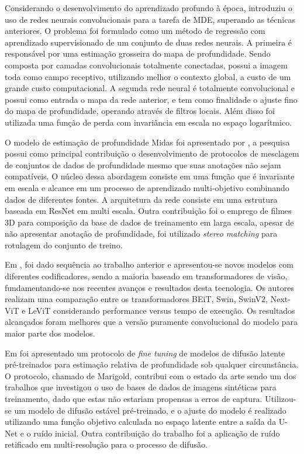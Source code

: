 Considerando o desenvolvimento do aprendizado profundo à época,  introduziu o uso de redes neurais convolucionais para a tarefa de MDE, superando as técnicas anteriores. O problema foi formulado como um método de regressão com aprendizado supervisionado de um conjunto de duas redes neurais. A primeira é responsável por uma estimação grosseira do mapa de profundidade. Sendo composta por camadas convolucionais totalmente conectadas, possui a imagem toda como campo receptivo, utilizando melhor o contexto global, a custo de um grande custo computacional. A segunda rede neural é totalmente convolucional e possui como entrada o mapa da rede anterior, e tem como finalidade o ajuste fino do mapa de profundidade, operando através de filtros locais. Além disso foi utilizada uma função de perda com invariância em escala no espaço logarítmico.

O modelo de estimação de profundidade Midas foi apresentado por , a pesquisa possui como principal contribuição o desenvolvimento de protocolos de mesclagem de conjuntos de dados de profundidade mesmo que suas anotações não sejam compatíveis. O núcleo dessa abordagem consiste em uma função que é invariante em escala e alcance em um processo de aprendizado multi-objetivo combinando dados de diferentes fontes. A arquitetura da rede consiste em uma estrutura baseada em ResNet em multi escala. Outra contribuição foi o emprego de filmes 3D para composição da base de dados de treinamento em larga escala, apesar de não apresentar anotação de profundidade, foi utilizado \textit{stereo matching} para rotulagem do conjunto de treino. 

Em \cite{birkl2023midas}, foi dado sequência ao trabalho anterior e apresentou-se novos modelos com diferentes codificadores, sendo a maioria baseado em transformadores de visão, fundamentando-se nos recentes avanços e resultados desta tecnologia. Os autores realizam uma comparação entre os transformadores BEiT, Swin, SwinV2, Next-ViT e LeViT considerando performance versus tempo de execução. Os resultados alcançados foram melhores que a versão puramente convolucional do modelo para  maior parte dos modelos. 

Em \cite{ke2024repurposing} foi apresentado um protocolo de \textit{fine tuning} de modelos de difusão latente pré-treinados para estimação relativa de profundidade sob qualquer circunstância. O protocolo, chamado de Marigold, contribui com o estado da arte sendo um dos trabalhos que investigou o uso de bases de dados de imagens sintéticas para treinamento, dado que estas não estariam propensas a erros de captura. Utilizou-se um modelo de difusão estável pré-treinado, e o ajuste do modelo é realizado utilizando uma função objetivo calculada no espaço latente entre a saída da U-Net e o ruído inicial. Outra contribuição do trabalho foi a aplicação de ruído retificado em multi-resolução para o processo de difusão. 

